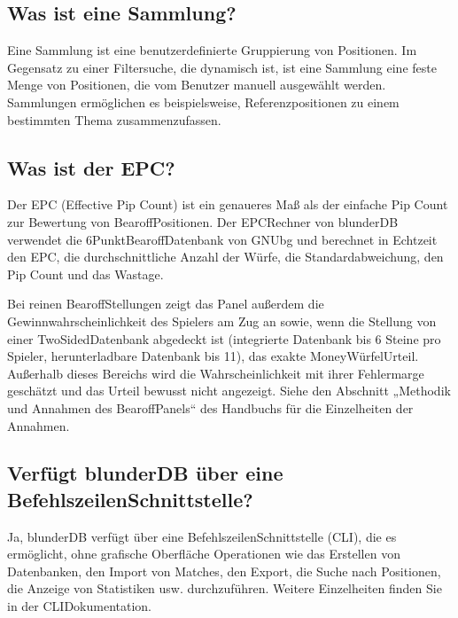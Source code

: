 \documentclass[letterpaper,10pt,german]{sphinxmanual}
\begin{document}
\subsection{Was ist eine Sammlung?}
\label{\detokenize{faq:qu-est-ce-qu-une-collection}}
\sphinxAtStartPar
Eine Sammlung ist eine benutzerdefinierte Gruppierung von Positionen. Im Gegensatz zu einer Filtersuche, die dynamisch ist, ist eine Sammlung eine feste Menge von Positionen, die vom Benutzer manuell ausgewählt werden. Sammlungen ermöglichen es beispielsweise, Referenzpositionen zu einem bestimmten Thema zusammenzufassen.


\subsection{Was ist der EPC?}
\label{\detokenize{faq:qu-est-ce-que-l-epc}}
\sphinxAtStartPar
Der EPC (Effective Pip Count) ist ein genaueres Maß als der einfache Pip Count zur Bewertung von Bearoff\sphinxhyphen{}Positionen. Der EPC\sphinxhyphen{}Rechner von blunderDB verwendet die 6\sphinxhyphen{}Punkt\sphinxhyphen{}Bearoff\sphinxhyphen{}Datenbank von GNUbg und berechnet in Echtzeit den EPC, die durchschnittliche Anzahl der Würfe, die Standardabweichung, den Pip Count und das Wastage.

\sphinxAtStartPar
Bei reinen Bearoff\sphinxhyphen{}Stellungen zeigt das Panel außerdem die Gewinnwahrscheinlichkeit des Spielers am Zug an sowie, wenn die Stellung von einer Two\sphinxhyphen{}Sided\sphinxhyphen{}Datenbank abgedeckt ist (integrierte Datenbank bis 6 Steine pro Spieler, herunterladbare Datenbank bis 11), das exakte Money\sphinxhyphen{}Würfel\sphinxhyphen{}Urteil. Außerhalb dieses Bereichs wird die Wahrscheinlichkeit mit ihrer Fehlermarge geschätzt und das Urteil bewusst nicht angezeigt. Siehe den Abschnitt „Methodik und Annahmen des Bearoff\sphinxhyphen{}Panels“ des Handbuchs für die Einzelheiten der Annahmen.


\subsection{Verfügt blunderDB über eine Befehlszeilen\sphinxhyphen{}Schnittstelle?}
\label{\detokenize{faq:blunderdb-dispose-t-il-d-une-interface-en-ligne-de-commande}}
\sphinxAtStartPar
Ja, blunderDB verfügt über eine Befehlszeilen\sphinxhyphen{}Schnittstelle (CLI), die es ermöglicht, ohne grafische Oberfläche Operationen wie das Erstellen von Datenbanken, den Import von Matches, den Export, die Suche nach Positionen, die Anzeige von Statistiken usw. durchzuführen. Weitere Einzelheiten finden Sie in der CLI\sphinxhyphen{}Dokumentation.
\end{document}

